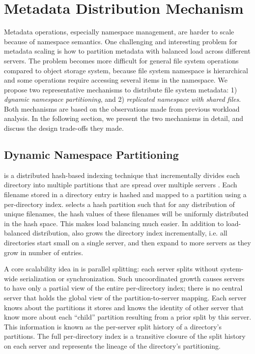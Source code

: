 \section{Metadata Distribution Mechanism}
Metadata operations, especially namespace management, are harder to scale
because of namespace semantics.
One challenging and interesting problem for metadata scaling is
how to partition metadata with balanced load across different servers.
The problem becomes more difficult for general file system operations
compared to object storage system,
because file system namespace is hierarchical and
some operations require accessing several items in the namespace.
We propose two representative mechanisms to distribute file system metadata:
1) \textit{dynamic namespace partitioning},
and 2) \textit{replicated namespace with shared files}.
Both mechanisms are based on the observations
made from previous workload analysis. In the following section,
we present the two mechanisms in detail, and discuss the design
trade-offs they made.

\subsection{Dynamic Namespace Partitioning}
\giga is a distributed hash-based indexing technique that incrementally
divides each directory into multiple partitions that are spread over multiple
servers \cite{GIGA11}.
Each filename stored in a directory entry is hashed and mapped to a partition
using a per-directory index.
\giga selects a hash partition such that for any distribution of unique filenames,
the hash values of these filenames will be uniformly distributed in the hash space.
This makes load balancing much easier.
In addition to load-balanced distribution, \giga also grows the directory
index incrementally, i.e. all directories start small on a single server, and
then expand to more servers as they grow in number of entries.

A core scalability idea in \giga is parallel splitting: each server splits
without system-wide serialization or synchronization.
Such uncoordinated growth causes \giga servers to have only a partial view of
the entire per-directory index;
there is no central server that holds the global view of the
partition-to-server mapping.
Each server knows about the partitions it stores and knows the
identity of other server that know more about each ``child'' partition
resulting from a prior split by this server.
This information is known as the per-server split history of
a directory's partitions.
The full per-directory \giga index is
a transitive closure of the split history on each
server and represents the lineage of the directory's partitioning.

